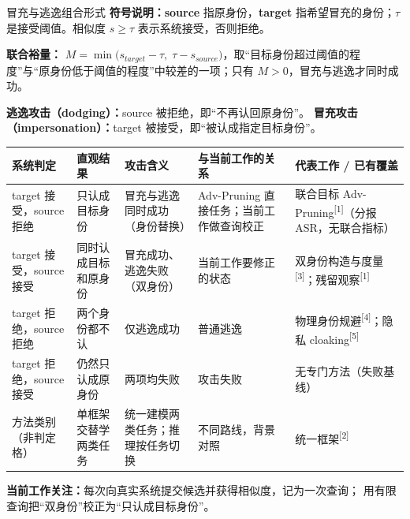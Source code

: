 
\begin{frame}{冒充与逃逸组合形式}
  \scriptsize
  \textbf{符号说明：}\textbf{source} 指原身份，\textbf{target} 指希望冒充的身份；\textbf{$\tau$} 是接受阈值。相似度 $s\ge\tau$ 表示系统接受，否则拒绝。

  \textbf{联合裕量：} $M=\min\big(s_{target}-\tau,\;\tau-s_{source}\big)$，取“目标身份超过阈值的程度”与“原身份低于阈值的程度”中较差的一项；只有 $M>0$，冒充与逃逸才同时成功。

  \textbf{逃逸攻击（dodging）：}source 被拒绝，即“不再认回原身份”。\quad
  \textbf{冒充攻击（impersonation）：}target 被接受，即“被认成指定目标身份”。

  \vspace{0.1em}
  \centering
  \tiny
  \setlength{\tabcolsep}{4pt}\renewcommand{\arraystretch}{1.0}
  \begin{tabular}{p{2.0cm}p{1.8cm}p{2.6cm}p{2.1cm}p{4.0cm}}
    \toprule
    系统判定 & 直观结果 & 攻击含义 & 与当前工作的关系 & 代表工作 / 已有覆盖 \\
    \midrule
    target 接受，source 拒绝 & 只认成目标身份 & 冒充与逃逸同时成功（身份替换） & Adv-Pruning 直接任务；当前工作做查询校正 & 联合目标 Adv-Pruning\textsuperscript{[1]}（分报 ASR，无联合指标） \\
    target 接受，source 接受 & 同时认成目标和原身份 & 冒充成功、逃逸失败（双身份） & 当前工作要修正的状态 & 双身份构造与度量\textsuperscript{[3]}；残留观察\textsuperscript{[1]} \\
    target 拒绝，source 拒绝 & 两个身份都不认 & 仅逃逸成功 & 普通逃逸 & 物理身份规避\textsuperscript{[4]}；隐私 cloaking\textsuperscript{[5]} \\
    target 拒绝，source 接受 & 仍然只认成原身份 & 两项均失败 & 攻击失败 & 无专门方法（失败基线） \\
    方法类别（非判定格） & 单框架交替学两类任务 & 统一建模两类任务；推理按任务切换 & 不同路线，背景对照 & 统一框架\textsuperscript{[2]} \\
    \bottomrule
  \end{tabular}

  \vspace{0.08em}
  {\scriptsize\color{sjtuRedPrimary}\textbf{当前工作关注：}每次向真实系统提交候选并获得相似度，记为一次查询；
  用有限查询把“双身份”校正为“只认成目标身份”。}
\end{frame}

